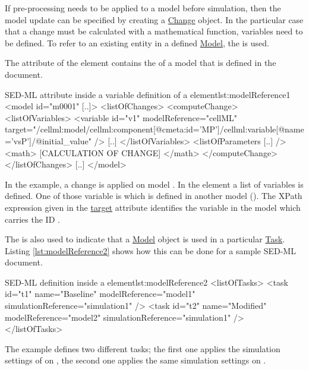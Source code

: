 If pre-processing needs to be applied to a model before simulation, then the model update can be specified by creating a \hyperref[class:change]{Change} object. In the particular case that a change must be calculated with a mathematical function, variables need to be defined. To refer to an existing entity in a defined \hyperref[class:model]{Model}, the  is used. 

The  attribute of the  element contains the  of a model that is defined in the document. 


\begin{myXmlLst}{SED-ML  attribute inside a variable definition of a  element}{lst:modelReference1}
<model id="m0001" [..]>
	<listOfChanges>
		<computeChange>
			<listOfVariables>
				<variable id="v1" modelReference="cellML" target="/cellml:model/cellml:component[@cmeta:id='MP']/cellml:variable[@name='vsP']/@initial_value" />
     			[..]
			</listOfVariables>
			<listOfParameters [..] />
    			<math>
     			[CALCULATION OF CHANGE]
    			</math>
   		</computeChange>
	</listOfChanges>
	[..]
</model>
\end{myXmlLst}

In the example, a change is  applied on model . In the  element a list of variables is defined. One of those variable is  which is defined in another model (). The XPath expression given in the \hyperref[sec:target]{target} attribute identifies the variable in the model which carries the ID .

The  is also used to indicate that a \hyperref[class:model]{Model} object is used in a particular  \hyperref[class:task]{Task}. Listing \ref{lst:modelReference2} shows how this can be done for a sample SED-ML document.

\begin{myXmlLst}{SED-ML  definition inside a  element}{lst:modelReference2}
<listOfTasks>
	<task id="t1" name="Baseline" modelReference="model1" simulationReference="simulation1" />
	<task id="t2" name="Modified" modelReference="model2" simulationReference="simulation1" />
</listOfTasks>
\end{myXmlLst}

The example defines two different tasks; the first one applies the simulation settings of  on , the second one applies the same simulation settings on .


